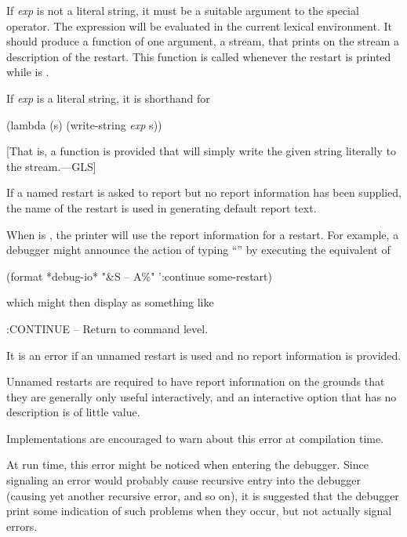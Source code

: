 \begin{defmac}
\begin{flushdesc}
  If \emph{exp} is not a literal string, it must be a suitable argument to the
   special operator. The expression 
  will be evaluated in the current lexical environment. It should produce a
  function of one argument, a stream, that prints on the stream a description of
  the restart. This function is called whenever the restart is printed while
   is .

  If \emph{exp} is a literal string, it is shorthand for
  \begin{lisp}
    (lambda (s) (write-string \emph{exp} s))
  \end{lisp}
  [That is, a function is provided that will simply write the given
  string literally to the stream.---GLS]

  If a named restart is asked to report but no report information has been
  supplied, the name of the restart is used in generating default report text.

  When  is , the printer will use the report
  information for a restart. For example, a debugger might announce the action
  of typing ``'' by executing the equivalent of
  \begin{lisp}
    (format *debug-io* "{\Xtilde}\&{\Xtilde}S -- {\Xtilde}A{\Xtilde}\%" ':continue some-restart)
  \end{lisp}
  which might then display as something like
  \begin{lisp}
    :CONTINUE -- Return to command level.
  \end{lisp}

  It is an error if an unnamed restart is used and no report information
  is provided.

\beforenoterule
\begin{rationale}
Unnamed restarts are required to have report information on
the grounds that they are generally only useful interactively, and an
interactive option that has no description is of little value.
\end{rationale}
\betweennoterule
\begin{implementation}
Implementations are encouraged to warn about this error
at compilation time.

At run time, this error might be noticed when entering the debugger. Since
signaling an error would probably cause recursive entry into the debugger
(causing yet another recursive error, and so on), it is suggested that the
debugger print some indication of such problems when they occur, but not
actually signal errors.
\end{implementation}
\afternoterule


\end{flushdesc}
\end{defmac}
